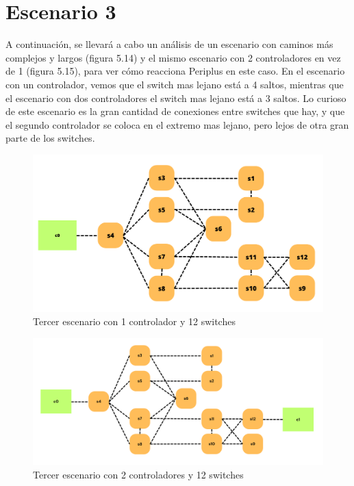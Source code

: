 \documentclass[a4paper, 12pt]{book}
\begin{document}
 	
 	\clearpage
 	\section{Escenario 3}
 	 
 	A continuación, se llevará a cabo un análisis de un escenario con caminos más complejos y largos (figura 5.14) y el mismo escenario con 2 controladores en vez de 1 (figura 5.15), para ver cómo reacciona Periplus en este caso.
 	En el escenario con un controlador, vemos que el switch mas lejano está a 4 saltos, mientras que el escenario con dos controladores el switch mas lejano está a 3 saltos. Lo curioso de este escenario es la gran cantidad de conexiones entre switches que hay, y que el segundo controlador se coloca en el extremo mas lejano, pero lejos de otra gran parte de los switches.
 	
 	\begin{figure}[H]
 		\centering
 		\includegraphics[width=14cm, keepaspectratio]{img/b4_1}
 		\caption{Tercer escenario con 1 controlador y 12 switches}
 		\label{figura:b4_1}
 	\end{figure}
 	
 	\begin{figure}[H]
 		\centering
 		\includegraphics[width=14cm, keepaspectratio]{img/b4_2}
 		\caption{Tercer escenario con 2 controladores y 12 switches}
 		\label{figura:b4_2}
 	\end{figure}
 	
\end{document}
